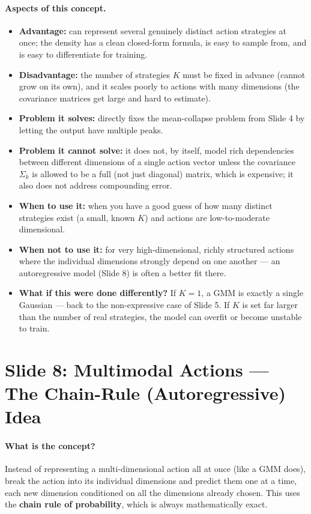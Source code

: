 \documentclass[11pt]{article}
\begin{document}
\paragraph{Aspects of this concept.}
\begin{itemize}
\item \textbf{Advantage:} can represent several genuinely distinct action strategies at
once; the density has a clean closed-form formula, is easy to sample from, and is easy
to differentiate for training.
\item \textbf{Disadvantage:} the number of strategies $K$ must be fixed in advance
(cannot grow on its own), and it scales poorly to actions with many dimensions (the
covariance matrices get large and hard to estimate).
\item \textbf{Problem it solves:} directly fixes the mean-collapse problem from Slide 4
by letting the output have multiple peaks.
\item \textbf{Problem it cannot solve:} it does not, by itself, model rich dependencies
between different dimensions of a single action vector unless the covariance $\Sigma_k$
is allowed to be a full (not just diagonal) matrix, which is expensive; it also does not
address compounding error.
\item \textbf{When to use it:} when you have a good guess of how many distinct
strategies exist (a small, known $K$) and actions are low-to-moderate dimensional.
\item \textbf{When not to use it:} for very high-dimensional, richly structured actions
where the individual dimensions strongly depend on one another --- an autoregressive
model (Slide 8) is often a better fit there.
\item \textbf{What if this were done differently?} If $K=1$, a GMM is exactly a single
Gaussian --- back to the non-expressive case of Slide 5. If $K$ is set far larger than
the number of real strategies, the model can overfit or become unstable to train.
\end{itemize}

\section{Slide 8: Multimodal Actions --- The Chain-Rule (Autoregressive) Idea}

\paragraph{What is the concept?}
Instead of representing a multi-dimensional action all at once (like a GMM does), break
the action into its individual dimensions and predict them one at a time, each new
dimension conditioned on all the dimensions already chosen. This uses the
\textbf{chain rule of probability}, which is always mathematically exact.
\end{document}
